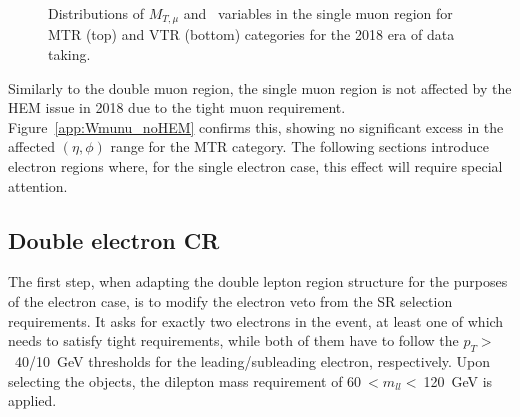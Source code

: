 \begin{figure}[htbp]
{    }
  \caption{Distributions of $M_{T,\mu}$ and \mindphinomu~variables in the single muon region for MTR (top) and VTR (bottom) categories for the 2018 era of data taking.}
  \label{fig:2018_Wmunu_2}
\end{figure}

\newpage



\hspace{10pt} Similarly to the double muon region, the single muon region is not affected by the HEM issue in 2018 due to the tight muon requirement. Figure~\ref{app:Wmunu_noHEM} confirms this, showing no significant excess in the affected $(\eta, \phi)$ range for the MTR category. The following sections introduce electron regions where, for the single electron case, this effect will require special attention.

\subsection{Double electron CR}
\hspace{10pt} The first step, when adapting the double lepton region structure for the purposes of the electron case, is to modify the electron veto from the SR selection requirements. It asks for exactly two electrons in the event, at least one of which needs to satisfy tight requirements, while both of them have to follow the $p_T>$~40/10~GeV thresholds for the leading/subleading electron, respectively. Upon selecting the objects, the dilepton mass requirement of 60$~<m_{ll}<~$120~GeV is applied.

